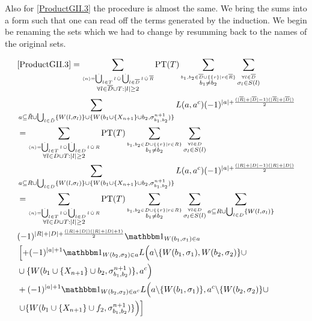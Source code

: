 \documentclass[b5paper,draft,openbib,12pt]{memoir}
\DeclareMathOperator{\dotCup}{\mathop{\dot{\bigcup}}}
\DeclareMathOperator{\dotcup}{\mathop{\dot{\cup}}}
\newcommand{\id}{{\mathbbm 1}}
\begin{document}
Also for \eqref{ProductGII.3} the procedure is almost the same. We bring the sums into a form such that one can read off the
terms generated by the induction. We begin be renaming the sets which we had to change by resumming back to the names 
of the original sets. 


\begin{align}\notag
&\eqref{ProductGII.3}=
\sum_{\stackrel{\langle n \rangle = \dotCup_{l\in T}l \dotcup \dotCup_{l\in \overline{D}}l \dotcup \overline{R}}{\forall l \in \overline{D}\cup T: |l|\ge 2}} 
\text{PT}(T) 
\sum_{\stackrel{b_1,b_2\in \overline{D} \cup \{\{r\}\mid r \in \overline{R}\}}{b_1 \neq b_2}} 
\sum_{\stackrel{\forall l \in \overline{D} }{\sigma_l \in S(l)}}\\\notag
&\sum_{a \subseteq \tilde{R}\cup \bigcup_{l \in \tilde{D}}\{W(l,\sigma_l)\} \cup \{W(b_1\cup \{X_{n+1}\}\cup b_2,\sigma^{n+1}_{b_1,b_2})\}} L(a,a^c) (-1)^{|a|+ \frac{(|\overline{R}|+|\overline{D}|-1)(|\overline{R}|+|\overline{D}|)}{2}}\\\notag
&=\sum_{\stackrel{\langle n \rangle = \dotCup_{l\in T}l \dotcup \dotCup_{l\in D}l \dotcup R}{\forall l \in D\cup T: |l|\ge 2}} 
\text{PT}(T) 
\sum_{\stackrel{b_1,b_2\in D \cup \{\{r\}\mid r \in R\}}{b_1 \neq b_2}} 
\sum_{\stackrel{\forall l \in D }{\sigma_l \in S(l)}}\\\notag
&\sum_{a \subseteq R\cup \bigcup_{l \in D}\{W(l,\sigma_l)\} \cup \{W(b_1\cup \{X_{n+1}\}\cup b_2,\sigma^{n+1}_{b_1,b_2})\}} L(a,a^c) (-1)^{|a|+ \frac{(| R|+|D|-1)(|R|+|D|)}{2}}\\\notag
&=\sum_{\stackrel{\langle n \rangle = \dotCup_{l\in T}l \dotcup \dotCup_{l\in D}l \dotcup R}{\forall l \in D\cup T: |l|\ge 2}} 
\text{PT}(T) 
\sum_{\stackrel{b_1,b_2\in D \cup \{\{r\}\mid r \in R\}}{b_1 \neq b_2}} 
\sum_{\stackrel{\forall l \in D }{\sigma_l \in S(l)}} \sum_{a \subseteq R\cup \bigcup_{l \in D}\{W(l,\sigma_l)\}} \\\notag
&(-1)^{|R|+|D|+ \frac{(|R|+|D|)(|R|+|D|+1)}{2}} \id_{W(b_1,\sigma_1)\in a}\\\notag
&\left[+(-1)^{|a|+1}\id_{W(b_2,\sigma_2)\in a} L\Big(a\backslash\{W(b_1,\sigma_1),W(b_2,\sigma_2)\}\cup\right.\\\notag
&\cup \{W(b_1\cup \{X_{n+1}\}\cup b_2,\sigma^{n+1}_{b_1,b_2})\} ,a^c\Big) \\\notag
&+(-1)^{|a|+1}\id_{W(b_2,\sigma_2)\in a^c}L\Big(a\backslash\{W(b_1,\sigma_1)\} ,a^c \backslash\{W(b_2,\sigma_2)\}\cup\\\notag
&\left. \cup \{W(b_1\cup \{X_{n+1}\}\cup f_2,\sigma^{n+1}_{b_1,b_2})\}\Big) \right]\\\notag

\end{align}
\end{document}
